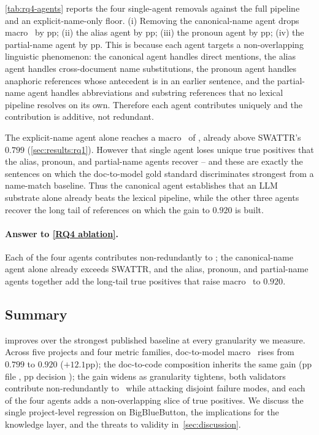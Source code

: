 \autoref{tab:rq4-agents} reports the four single-agent removals against the full pipeline and an explicit-name-only floor.
(i) Removing the canonical-name agent drops macro \fone\ by pp; (ii) the alias agent by pp; (iii) the pronoun agent by pp; (iv) the partial-name agent by pp.
This is because each agent targets a non-overlapping linguistic phenomenon: the canonical agent handles direct mentions, the alias agent handles cross-document name substitutions, the pronoun agent handles anaphoric references whose antecedent is in an earlier sentence, and the partial-name agent handles abbreviations and substring references that no lexical pipeline resolves on its own.
Therefore each agent contributes uniquely and the contribution is additive, not redundant.

The explicit-name agent alone reaches a macro \fone\ of , already above SWATTR's $0.799$ (\autoref{sec:results:rq1}).
However that single agent loses  unique true positives that the alias, pronoun, and partial-name agents recover -- and these are exactly the sentences on which the doc-to-model gold standard discriminates strongest from a name-match baseline.
Thus the canonical agent establishes that an \ac{LLM} substrate alone already beats the lexical pipeline, while the other three agents recover the long tail of references on which the gain to $0.920$ is built.

\paragraph{Answer to \ref{RQ4 ablation}.}
Each of the four agents contributes non-redundantly to \fone; the canonical-name agent alone already exceeds SWATTR, and the alias, pronoun, and partial-name agents together add the long-tail true positives that raise macro \fone\ to $0.920$.

\subsection{Summary}
\label{sec:results:summary}

\approach{} improves over the strongest published baseline at every granularity we measure.
Across five projects and four metric families, doc-to-model macro \fone\ rises from $0.799$ to $0.920$ ($+12.1$pp); the doc-to-code composition inherits the same gain (pp file \fone, pp decision \fone); the gain widens as granularity tightens, both validators contribute non-redundantly to \fone\ while attacking disjoint failure modes, and each of the four agents adds a non-overlapping slice of true positives.
We discuss the single project-level regression on BigBlueButton, the implications for the knowledge layer, and the threats to validity in~\autoref{sec:discussion}.

